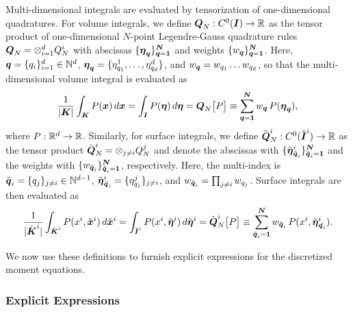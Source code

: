 \documentclass[10pt,preprint]{aastex}
\begin{document}
Multi-dimensional integrals are evaluated by tensorization of one-dimensional quadratures.  
For volume integrals, we define $\boldsymbol{Q}_{N}:C^{0}(\boldsymbol{I})\to\mathbb{R}$ as the tensor product of one-dimensional $N$-point Legendre-Gauss quadrature rules $\boldsymbol{Q}_{N}=\otimes_{i=1}^{d}Q_{N}^{i}$ with abscissas $\{\boldsymbol{\eta}_{\boldsymbol{q}}\}_{\boldsymbol{q}=\boldsymbol{1}}^{\boldsymbol{N}}$ and weights $\{w_{\boldsymbol{q}}\}_{\boldsymbol{q}=\boldsymbol{1}}^{\boldsymbol{N}}$.  
Here, $\boldsymbol{q}=\{q_{i}\}_{i=1}^{d}\in\mathbb{N}^{d}$, $\boldsymbol{\eta}_{\boldsymbol{q}}=\{\eta_{q_{1}}^{1},\ldots,\eta_{q_{d}}^{d}\}$, and $w_{\boldsymbol{q}}=w_{q_{1}}\ldots w_{q_{d}}$, so that the multi-dimensional volume integral is evaluated as
\begin{equation}
  \frac{1}{|\boldsymbol{K}|}\int_{\boldsymbol{K}}P(\boldsymbol{x})\,d\boldsymbol{x}
  =\int_{\boldsymbol{I}}P(\boldsymbol{\eta})\,d\boldsymbol{\eta}
  =\boldsymbol{Q}_{N}\big[P\big]
  \equiv\sum_{\boldsymbol{q}=\boldsymbol{1}}^{\boldsymbol{N}}w_{\boldsymbol{q}}\,P(\boldsymbol{\eta}_{\boldsymbol{q}}),
\end{equation}
where $P:\mathbb{R}^{d}\to\mathbb{R}$.  
Similarly, for surface integrals, we define $\tilde{\boldsymbol{Q}}_{N}^{i}:C^{0}(\tilde{\boldsymbol{I}}^{i})\to\mathbb{R}$ as the tensor product $\tilde{\boldsymbol{Q}}_{N}^{i}=\otimes_{j\ne i}Q_{N}^{j}$ and denote the abscissas with $\{\tilde{\boldsymbol{\eta}}_{\tilde{\boldsymbol{q}}_{i}}^{i}\}_{\tilde{\boldsymbol{q}}_{i}=\boldsymbol{1}}^{\boldsymbol{N}}$ and the weights with $\{w_{\tilde{\boldsymbol{q}}_{i}}\}_{\tilde{\boldsymbol{q}}_{i}=\boldsymbol{1}}^{\boldsymbol{N}}$, respectively.  
Here, the multi-index is $\tilde{\boldsymbol{q}}_{i}=\{q_{j}\}_{j\ne i}\in\mathbb{N}^{d-1}$, $\tilde{\boldsymbol{\eta}}_{\tilde{\boldsymbol{q}}_{i}}^{i}=\{\eta_{q_{j}}^{j}\}_{j\ne i}$, and $w_{\tilde{\boldsymbol{q}}_{i}}=\prod_{j\ne i}w_{q_{j}}$.  
Surface integrals are then evaluated as
\begin{equation}
  \frac{1}{|\tilde{\boldsymbol{K}}^{i}|}\int_{\tilde{\boldsymbol{K}}^{i}}P(x^{i},\tilde{\boldsymbol{x}}^{i})\,d\tilde{\boldsymbol{x}}^{i}
  =\int_{\tilde{\boldsymbol{I}}^{i}}P(x^{i},\tilde{\boldsymbol{\eta}}^{i})\,d\tilde{\boldsymbol{\eta}}^{i}
  =\tilde{\boldsymbol{Q}}_{N}^{i}\big[P\big]
  \equiv\sum_{\tilde{\boldsymbol{q}}_{i}=\boldsymbol{1}}^{\boldsymbol{N}}w_{\tilde{\boldsymbol{q}}_{i}}\,P(x^{i},\tilde{\boldsymbol{\eta}}_{\tilde{\boldsymbol{q}_{i}}}^{i}).  
\end{equation}

We now use these definitions to furnish explicit expressions for the discretized moment equations.  

\subsubsection{Explicit Expressions}
\end{document}
